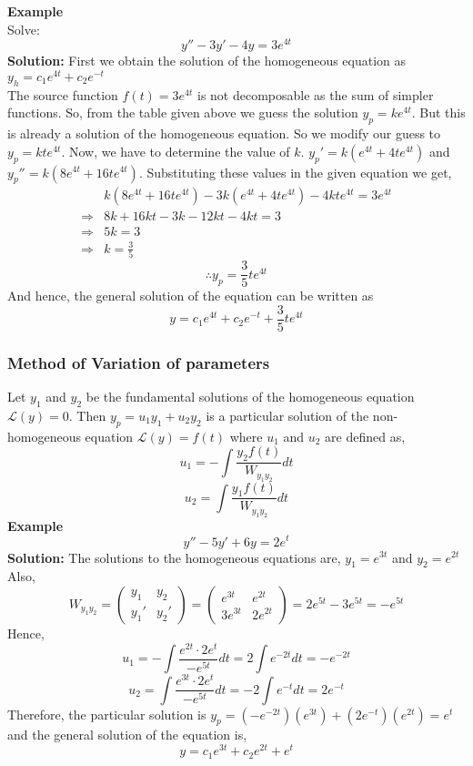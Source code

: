 \documentclass[10pt]{article}
\begin{document}
                \textbf{Example}\\
                Solve: $$y'' - 3y' - 4y = 3e^{4t}$$
                \textbf{Solution: }First we obtain the solution of the homogeneous equation as $y_h = c_1e^{4t} + c_2e^{-t}$ \\
                The source function $f(t) = 3e^{4t}$ is not decomposable as the sum of simpler functions. So, from the table given above we guess the solution $y_p = ke^{4t}$. But this is already a solution of the homogeneous equation. So we modify our guess to $y_p = kte^{4t}$. Now, we have to determine the value of $k$. $y_p' = k(e^{4t} + 4te^{4t})$ and $y_p'' = k(8e^{4t} + 16te^{4t})$. Substituting these values in the given equation we get,
                \begin{align*}
                    &k(8e^{4t}+ 16te^{4t}) - 3k(e^{4t} + 4te^{4t}) - 4kte^{4t} = 3e^{4t} \\
                    \Rightarrow &8k + 16kt - 3k - 12kt - 4kt = 3 \\
                    \Rightarrow &5k = 3\\
                    \Rightarrow & k = \frac{3}{5}
                \end{align*}
                $$\therefore y_p = \frac{3}{5}te^{4t}$$
                And hence, the general solution of the equation can be written as $$y = c_1e^{4t} + c_2e^{-t} + \frac{3}{5}te^{4t}$$
            \subsubsection{Method of Variation of parameters}
                Let $y_1$ and $y_2$ be the fundamental solutions of the homogeneous equation $\mathcal{L}(y) = 0$. Then $y_p = u_1y_1 + u_2y_2$ is a particular solution of the non-homogeneous equation $\mathcal{L}(y) = f(t)$ where $u_1$ and $u_2$ are defined as,
                $$u_1 = -\int\frac{y_2f(t)}{W_{y_1y_2}}dt$$
                $$u_2 = \int\frac{y_1f(t)}{W_{y_1y_2}}dt$$
                \textbf{Example}\\
                $$y'' - 5y' + 6y = 2e^t$$
                \textbf{Solution: } The solutions to the homogeneous equations are, $y_1 = e^{3t}$ and $y_2 = e^{2t}$ \\
                Also,
                $$
                W_{y_1y_2} = 
                \begin{pmatrix}
                y_1  & y_2 \\
                y_1' & y_2'
                \end{pmatrix}
                =
                \begin{pmatrix}
                e^{3t}  & e^{2t} \\
                3e^{3t} & 2e^{2t}
                \end{pmatrix}
                = 2e^{5t} - 3e^{5t} = -e^{5t}
                $$
                Hence,
                $$u_1 = -\int \frac{e^{2t} \cdot 2e^{t}}{-e^{5t}} dt = 2\int e^{-2t}dt = -e^{-2t}$$
                $$u_2 = \int \frac{e^{3t} \cdot 2e^{t}}{-e^{5t}} dt = -2\int e^{-t}dt = 2e^{-t}$$
                Therefore, the particular solution is $y_p = (-e^{-2t})(e^{3t})+(2e^{-t})(e^{2t}) = e^t$
                and the general solution of the equation is, $$y = c_1e^{3t} + c_2e^{2t} + e^t$$
\end{document}

